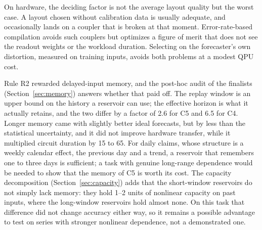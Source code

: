 \documentclass[journal]{IEEEtran}
\begin{document}
On hardware, the deciding factor is not the average layout quality but the worst case. A layout chosen without calibration data is usually adequate, and occasionally lands on a coupler that is broken at that moment. Error-rate-based compilation avoids such couplers but optimizes a figure of merit that does not see the readout weights or the workload duration. Selecting on the forecaster's own distortion, measured on training inputs, avoids both problems at a modest QPU cost.

Rule R2 rewarded delayed-input memory, and the post-hoc audit of the finalists (Section~\ref{sec:memory}) answers whether that paid off. The replay window is an upper bound on the history a reservoir can use; the effective horizon is what it actually retains, and the two differ by a factor of 2.6 for C5 and 6.5 for C4. Longer memory came with slightly better ideal forecasts, but by less than the statistical uncertainty, and it did not improve hardware transfer, while it multiplied circuit duration by 15 to 65. For daily claims, whose structure is a weekly calendar effect, the previous day and a trend, a reservoir that remembers one to three days is sufficient; a task with genuine long-range dependence would be needed to show that the memory of C5 is worth its cost. The capacity decomposition (Section~\ref{sec:capacity}) adds that the short-window reservoirs do not simply lack memory: they hold 1--2 units of nonlinear capacity on past inputs, where the long-window reservoirs hold almost none. On this task that difference did not change accuracy either way, so it remains a possible advantage to test on series with stronger nonlinear dependence, not a demonstrated one.
\end{document}
